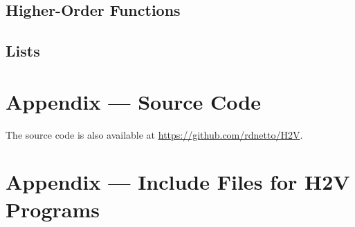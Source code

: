 \documentclass[english,onecolumn]{scrartcl}
\begin{document}
\subsection{Higher-Order Functions}
\label{sec:testHOFunc}





\subsection{Lists}
\label{sec:testList}




\section{Appendix --- Source Code}
The source code is also available at \url{https://github.com/rdnetto/H2V}.









\section{Appendix --- Include Files for H2V Programs}



\printbibliography
\end{document}
